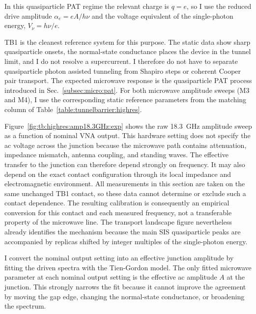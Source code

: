         In this quasiparticle PAT regime the relevant charge is $q=e$, so I use the reduced drive amplitude $\alpha_e=eA/h\nu$ and the voltage equivalent of the single-photon energy, $V_\nu=h\nu/e$.

        TB1 is the cleanest reference system for this purpose. The static data show sharp quasiparticle onsets, the normal-state conductance places the device in the tunnel limit, and I do not resolve a supercurrent. I therefore do not have to separate quasiparticle photon assisted tunneling from Shapiro steps or coherent Cooper pair transport. The expected microwave response is the quasiparticle PAT process introduced in Sec.~\ref{subsec:micro:pat}. For both microwave amplitude sweeps (M3 and M4), I use the corresponding static reference parameters from the matching column of Table~\ref{table:tunnelbarrier:highres}.


        Figure~\ref{fig:tb:highres:amp18.3GHz:exp} shows the raw \qty{18.3}{\giga\hertz} amplitude sweep as a function of nominal VNA output. This hardware setting does not specify the ac voltage across the junction because the microwave path contains attenuation, impedance mismatch, antenna coupling, and standing waves. The effective transfer to the junction can therefore depend strongly on frequency. It may also depend on the exact contact configuration through its local impedance and electromagnetic environment. All measurements in this section are taken on the same unchanged TB1 contact, so these data cannot determine or exclude such a contact dependence. The resulting calibration is consequently an empirical conversion for this contact and each measured frequency, not a transferable property of the microwave line. The transport landscape figure nevertheless already identifies the mechanism because the main SIS quasiparticle peaks are accompanied by replicas shifted by integer multiples of the single-photon energy.

        I convert the nominal output setting into an effective junction amplitude by fitting the driven spectra with the Tien-Gordon model. The only fitted microwave parameter at each nominal output setting is the effective ac amplitude $A$ at the junction. This strongly narrows the fit because it cannot improve the agreement by moving the gap edge, changing the normal-state conductance, or broadening the spectrum.

